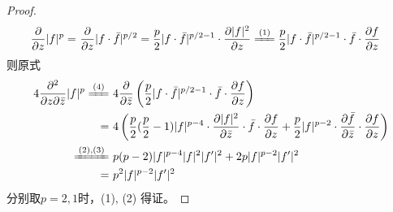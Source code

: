 \documentclass[12pt, a4paper, oneside]{ctexart}
\begin{document}
\begin{proof}
\begin{equation}
    \end{equation}
    \begin{equation}
        \begin{aligned}
            \frac{\partial}{\partial z}|f|^p=&\ \frac{\partial}{\partial z}|f\cdot \bar{f}|^{p/2} = \frac{p}{2}|f\cdot \bar{f}|^{p/2-1}\cdot \frac{\partial|f|^2}{\partial z} \xlongequal{(1)} \frac{p}{2}|f\cdot \bar{f}|^{p/2-1}\cdot \bar{f}\cdot \frac{\partial f}{\partial z}
        \end{aligned}
    \end{equation}
    则原式
    \begin{equation*}
        \begin{aligned}
            4\frac{\partial^2}{\partial z\partial \bar{z}}|f|^p\xlongequal{(4)}&\ 4\frac{\partial}{\partial \bar{z}}\left(\frac{p}{2}|f\cdot \bar{f}|^{p/2-1}\cdot \bar{f}\cdot \frac{\partial f}{\partial z}\right)\\
            =&\ 4\left(\frac{p}{2}(\frac{p}{2}-1)|f|^{p-4}\cdot\frac{\partial|f|^2}{\partial \bar{z}}\cdot \bar{f}\cdot\frac{\partial f}{\partial z}+\frac{p}{2}|f|^{p-2}\cdot\frac{\partial \bar{f}}{\partial \bar{z}}\cdot \frac{\partial f}{\partial z}\right)\\
            \xlongequal{(2),(3)}&\ p(p-2)|f|^{p-4}|f|^2|f'|^2+2p|f|^{p-2}|f'|^2\\
            =&\ p^2|f|^{p-2}|f'|^2
        \end{aligned}
    \end{equation*}
    分别取$p=2, 1$时，(1), (2) 得证。
\end{proof}
\end{document}
